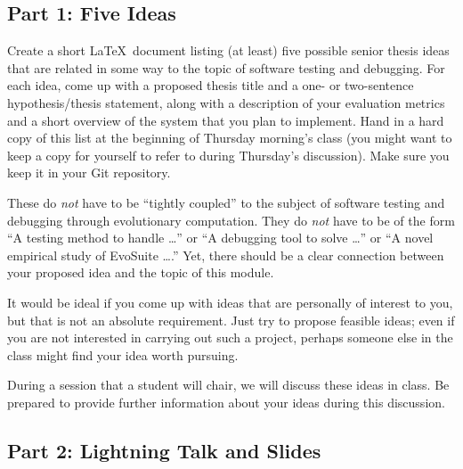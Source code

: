 
\usepackage[compact]{titlesec}




\subsection*{Part 1: Five Ideas}

Create a short \LaTeX\ document listing (at least) five possible senior thesis ideas that are related in some way to the
topic of software testing and debugging. For each idea, come up with a proposed thesis title and a one- or two-sentence
hypothesis/thesis statement, along with a description of your evaluation metrics and a short overview of the system
that you plan to implement. Hand in a hard copy of this list at the beginning of Thursday morning's class (you might
  want to keep a copy for yourself to refer to during Thursday's discussion). Make sure you keep it in your Git
  repository.

These do {\em not} have to be ``tightly coupled'' to the subject of software testing and debugging through evolutionary
computation. They do {\em not} have to be of the form ``A testing method to handle \ldots'' or ``A debugging tool to
solve \ldots'' or ``A novel empirical study of EvoSuite \ldots.'' Yet, there should be a clear connection between
your proposed idea and the topic of this module.

It would be ideal if you come up with ideas that are personally of interest to you, but that is not an absolute
requirement. Just try to propose feasible ideas; even if you are not interested in carrying out such a project, perhaps
someone else in the class might find your idea worth pursuing.

During a session that a student will chair, we will discuss these ideas in class. Be prepared to provide further
information about your ideas during this discussion.

\subsection*{Part 2: Lightning Talk and Slides}

